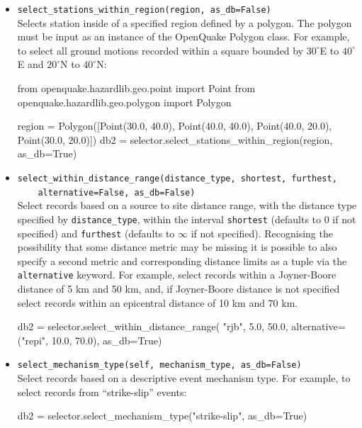\begin{itemize}
\item \verb;select_stations_within_region(region, as_db=False);\\

Selects station inside of a specified region defined by a polygon. The polygon must be input as an instance of the OpenQuake Polygon class. For example, to select all ground motions recorded within a square bounded by $30^{\circ}$E to $40^{\circ}$E and $20^{\circ}$N to $40^{\circ}$N:

\begin{python}
from openquake.hazardlib.geo.point import Point
from openquake.hazardlib.geo.polygon import Polygon

region = Polygon([Point(30.0, 40.0),
                  Point(40.0, 40.0),
                  Point(40.0, 20.0),
                  Point(30.0, 20.0)])
db2 = selector.select_stations_within_region(region,
                                             as_db=True)
\end{python}

\item \verb;select_within_distance_range(distance_type, shortest, furthest,;\\
\verb;    alternative=False, as_db=False);\\
Select records based on a source to site distance range, with the distance type specified by \verb=distance_type=, within the interval \verb=shortest= (defaults to 0 if not specified) and \verb=furthest= (defaults to $\infty$ if not specified). Recognising the possibility that some distance metric may be missing it is possible to also specify a second metric and corresponding distance limits as a tuple via the
\verb=alternative= keyword. For example, select records within a Joyner-Boore distance of 5 km and 50 km, and, if Joyner-Boore distance is not specified select records within an epicentral distance of 10 km and 70 km.

\begin{python}
db2 = selector.select_within_distance_range(
    "rjb", 5.0, 50.0,
    alternative=("repi", 10.0, 70.0),
    as_db=True) 
\end{python}

\item \verb;select_mechanism_type(self, mechanism_type, as_db=False);\\
Select records based on a descriptive event mechanism type. For example, to select records from ``strike-slip'' events:

\begin{python}
db2 = selector.select_mechanism_type("strike-slip",
                                     as_db=True) 
\end{python}


\end{itemize}
